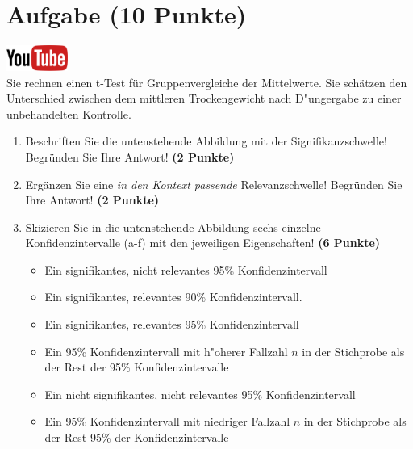 \documentclass[a4paper, 9pt]{scrartcl}\usepackage[]{graphicx}\usepackage[]{xcolor}
\begin{document}
 
\clearpage

\section{Aufgabe \hfill (10 Punkte)}

\hfill\href{https://youtu.be/CN_O4fYPbhs}{\includegraphics[width =
  2cm]{img/youtube}}\\[1Ex]



Sie rechnen einen t-Test f{\"u}r Gruppenvergleiche der Mittelwerte. Sie
sch{\"a}tzen den Unterschied zwischen dem mittleren Trockengewicht nach D{"u}ngergabe zu einer unbehandelten
Kontrolle.

\begin{enumerate}
\item Beschriften Sie die untenstehende Abbildung mit der
  Signifikanzschwelle! Begr{\"u}nden Sie Ihre Antwort! \textbf{(2 Punkte)}
\item Erg{\"a}nzen Sie eine \textit{in den Kontext passende} Relevanzschwelle!
  Begr{\"u}nden Sie Ihre Antwort! \textbf{(2 Punkte)} 
\item Skizieren Sie in die
  untenstehende Abbildung sechs einzelne Konfidenzintervalle (a-f) mit den
  jeweiligen Eigenschaften! \textbf{(6 Punkte)}
  \begin{itemize}
  \item[(a)] Ein signifikantes, nicht relevantes 95\% Konfidenzintervall 	
  \item[(b)] Ein signifikantes, relevantes 90\% Konfidenzintervall. 	
  \item[(c)] Ein signifikantes, relevantes 95\% Konfidenzintervall 	
  \item[(d)] Ein 95\% Konfidenzintervall mit h{"o}herer Fallzahl $n$ in der Stichprobe als der Rest der 95\% Konfidenzintervalle 
  \item[(e)] Ein nicht signifikantes, nicht relevantes 95\% Konfidenzintervall
  \item[(f)] Ein 95\% Konfidenzintervall mit niedriger Fallzahl $n$ in der Stichprobe als der Rest 95\% der Konfidenzintervalle
  \end{itemize}
\end{enumerate}
\end{document}
